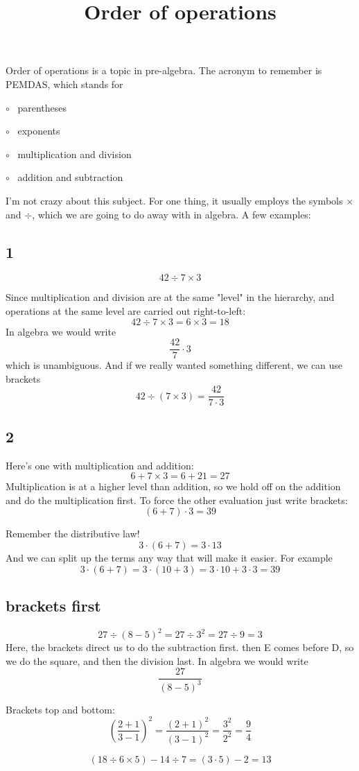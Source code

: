 \documentclass[11pt, oneside]{article}
\title{Order of operations}
\date{}
\begin{document}
\maketitle
\Large


Order of operations is a topic in pre-algebra.  The acronym to remember is PEMDAS, which stands for

$\circ$ \ parentheses

$\circ$ \ exponents

$\circ$ \ multiplication and division

$\circ$ \ addition and subtraction

I'm not crazy about this subject.  For one thing, it usually employs the symbols $\times$ and $\div$, which we are going to do away with in algebra.  A few examples:

\subsection*{1}

\[ 42 \div 7 \times 3 \]

Since multiplication and division are at the same "level" in the hierarchy, and operations at the same level are carried out right-to-left: 
\[ 42 \div 7 \times 3 = 6 \times 3 = 18 \]
In algebra we would write
\[ \frac{42}{7} \cdot 3 \]
which is unambiguous.  And if we really wanted something different, we can use brackets
\[ 42 \div (7 \times 3) = \frac{42}{7 \cdot 3} \]

\subsection*{2}

Here's one with multiplication and addition:
\[ 6 + 7 \times 3 = 6 + 21 = 27 \]
Multiplication is at a higher level than addition, so we hold off on the addition and do the multiplication first.  To force the other evaluation just write brackets:
\[ (6 + 7) \cdot 3  = 39 \]

Remember the distributive law!
\[ 3 \cdot (6 + 7) = 3 \cdot 13 \]
And we can split up the terms any way that will make it easier.  For example
\[ 3 \cdot (6 + 7) = 3 \cdot (10 + 3) = 3 \cdot 10 + 3 \cdot 3 = 39 \]

\subsection*{brackets first}

\[ 27 \div (8 - 5)^2 = 27 \div 3^2 = 27 \div 9 = 3 \]
Here, the brackets direct us to do the subtraction first.  then E comes before D, so we do the square, and then the division last.  In algebra we would write
\[ \frac{27}{(8-5)^3} \]

Brackets top and bottom:
\[ (\frac{2 + 1}{3 - 1})^2 = \frac{(2 + 1)^2}{(3 - 1)^2} = \frac{3^2}{2^2} = \frac{9}{4} \]

\[ (18 \div 6 \times 5) - 14 \div 7 = (3 \cdot 5) - 2 = 13 \]
\end{document}
